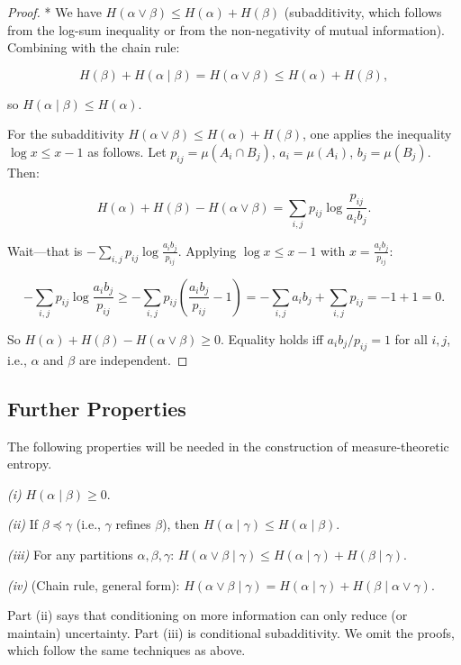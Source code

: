 \begin{proof}
* We have $H(\alpha \vee \beta) \leq H(\alpha) + H(\beta)$ (subadditivity, which follows from the log-sum inequality or from the non-negativity of mutual information). Combining with the chain rule:

\[
H(\beta) + H(\alpha \mid \beta) = H(\alpha \vee \beta) \leq H(\alpha) + H(\beta),
\]

so $H(\alpha \mid \beta) \leq H(\alpha)$.

For the subadditivity $H(\alpha \vee \beta) \leq H(\alpha) + H(\beta)$, one applies the inequality $\log x \leq x - 1$ as follows. Let $p_{ij} = \mu(A_i \cap B_j)$, $a_i = \mu(A_i)$, $b_j = \mu(B_j)$. Then:

\[
H(\alpha) + H(\beta) - H(\alpha \vee \beta) = \sum_{i,j} p_{ij} \log \frac{p_{ij}}{a_i b_j}.
\]

Wait---that is $-\sum_{i,j} p_{ij}\log\frac{a_i b_j}{p_{ij}}$. Applying $\log x \leq x - 1$ with $x = \frac{a_i b_j}{p_{ij}}$:

\[
-\sum_{i,j} p_{ij} \log\frac{a_i b_j}{p_{ij}} \geq -\sum_{i,j} p_{ij}\left(\frac{a_i b_j}{p_{ij}} - 1\right) = -\sum_{i,j} a_i b_j + \sum_{i,j} p_{ij} = -1 + 1 = 0.
\]

So $H(\alpha) + H(\beta) - H(\alpha \vee \beta) \geq 0$. Equality holds iff $a_i b_j / p_{ij} = 1$ for all $i, j$, i.e., $\alpha$ and $\beta$ are independent.
\end{proof}


\subsection{Further Properties}\label{sec:11.3.3}

The following properties will be needed in the construction of measure-theoretic entropy.

\begin{proposition}\label{prop:11.11.}

\textit{(i)} $H(\alpha \mid \beta) \geq 0$.

\textit{(ii)} If $\beta \preceq \gamma$ (i.e., $\gamma$ refines $\beta$), then $H(\alpha \mid \gamma) \leq H(\alpha \mid \beta)$.

\textit{(iii)} For any partitions $\alpha, \beta, \gamma$: $H(\alpha \vee \beta \mid \gamma) \leq H(\alpha \mid \gamma) + H(\beta \mid \gamma)$.

\textit{(iv)} (Chain rule, general form): $H(\alpha \vee \beta \mid \gamma) = H(\alpha \mid \gamma) + H(\beta \mid \alpha \vee \gamma)$.

Part (ii) says that conditioning on more information can only reduce (or maintain) uncertainty. Part (iii) is conditional subadditivity. We omit the proofs, which follow the same techniques as above.


\bigskip

\end{proposition}



